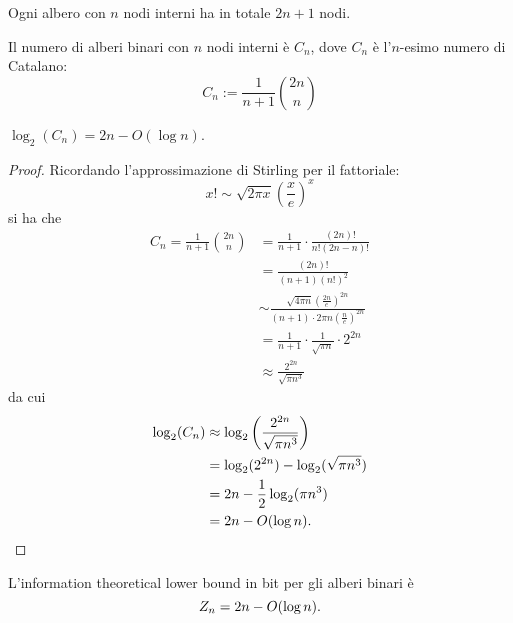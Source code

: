 \begin{corollario}
	Ogni albero con $n$ nodi interni ha in totale $2n+1$ nodi.
\end{corollario}

\begin{theorem}\label{thm:catalano}
	Il numero di alberi binari con $n$ nodi interni è $C_n$, dove $C_n$ è l'$n$-esimo numero di Catalano:
	\begin{equation*}
		C_n := \frac{1}{n+1}\binom{2n}{n}
	\end{equation*}
\end{theorem}
\begin{corollario}
	$\log_2(C_n)=2n-O(\log n)$.
\end{corollario}
\begin{proof}
	Ricordando l'approssimazione di Stirling per il fattoriale:
	\begin{equation*}
		x! \sim \sqrt{2\pi x} \left(\frac{x}{e}\right)^x
	\end{equation*}
	si ha che
	\begin{align*}
		C_n = \frac{1}{n+1}\binom{2n}{n} & = \frac{1}{n+1}\cdot\frac{(2n)!}{n!(2n-n)!}                                                             \\
		                                 & = \frac{(2n)!}{(n+1)(n!)^2}                                                                             \\
		                                 & \sim \frac{\sqrt{4\pi n}\left(\frac{2n}{e}\right)^{2n}}{(n+1)\cdot 2\pi n\left(\frac{n}{e}\right)^{2n}} \\
		                                 & = \frac{1}{n+1}\cdot \frac{1}{\sqrt{\pi n}}\cdot 2^{2n}                                                 \\
		                                 & \approx \frac{2^{2n}}{\sqrt{\pi n^3}}
	\end{align*}
	da cui
	\begin{align*}
		\log_2(C_n) & \approx \log_2\left(\frac{2^{2n}}{\sqrt{\pi n^3}}\right) \\
		            & = \log_2(2^{2n}) - \log_2(\sqrt{\pi n^3})                \\
		            & = 2n-\frac 12 \log_2(\pi n^3)                          \\
		            & = 2n-O(\log n) \text. \qedhere
	\end{align*}
\end{proof}
\begin{corollario}\label{corol:bitree:itlb}
	L'information theoretical lower bound in bit per gli alberi binari è
	\begin{equation*}
		Z_n = 2n-O(\log n) \text.
	\end{equation*}
\end{corollario}


